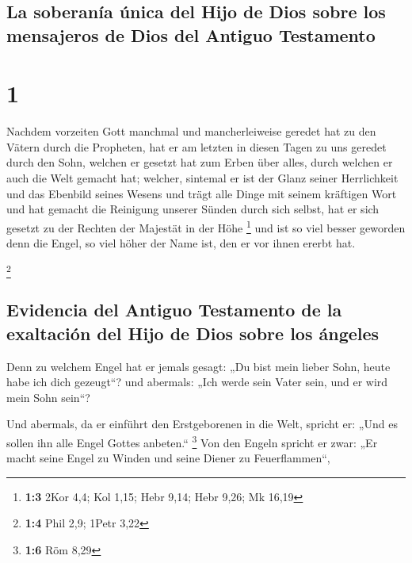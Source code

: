 \hypertarget{la-soberanuxeda-uxfanica-del-hijo-de-dios-sobre-los-mensajeros-de-dios-del-antiguo-testamento}{%
\subsection{La soberanía única del Hijo de Dios sobre los mensajeros de
Dios del Antiguo
Testamento}\label{la-soberanuxeda-uxfanica-del-hijo-de-dios-sobre-los-mensajeros-de-dios-del-antiguo-testamento}}

\hypertarget{section}{%
\section{1}\label{section}}

 Nachdem vorzeiten Gott manchmal und mancherleiweise
geredet hat zu den Vätern durch die Propheten,  hat er am
letzten in diesen Tagen zu uns geredet durch den Sohn, welchen er
gesetzt hat zum Erben über alles, durch welchen er auch die Welt gemacht
hat;  welcher, sintemal er ist der Glanz seiner
Herrlichkeit und das Ebenbild seines Wesens und trägt alle Dinge mit
seinem kräftigen Wort und hat gemacht die Reinigung unserer Sünden durch
sich selbst, hat er sich gesetzt zu der Rechten der Majestät in der Höhe
\footnote{\textbf{1:3} 2Kor 4,4; Kol 1,15; Hebr 9,14; Hebr 9,26; Mk
  16,19}  und ist so viel besser geworden denn die Engel,
so viel höher der Name ist, den er vor ihnen ererbt hat.

\footnote{\textbf{1:4} Phil 2,9; 1Petr 3,22}

\hypertarget{evidencia-del-antiguo-testamento-de-la-exaltaciuxf3n-del-hijo-de-dios-sobre-los-uxe1ngeles}{%
\subsection{Evidencia del Antiguo Testamento de la exaltación del Hijo
de Dios sobre los
ángeles}\label{evidencia-del-antiguo-testamento-de-la-exaltaciuxf3n-del-hijo-de-dios-sobre-los-uxe1ngeles}}

 Denn zu welchem Engel hat er jemals gesagt: „Du bist mein
lieber Sohn, heute habe ich dich gezeugt``? und abermals: „Ich werde
sein Vater sein, und er wird mein Sohn sein``?

 Und abermals, da er einführt den Erstgeborenen in die
Welt, spricht er: „Und es sollen ihn alle Engel Gottes anbeten.``
\footnote{\textbf{1:6} Röm 8,29}  Von den Engeln spricht
er zwar: „Er macht seine Engel zu Winden und seine Diener zu
Feuerflammen``,

